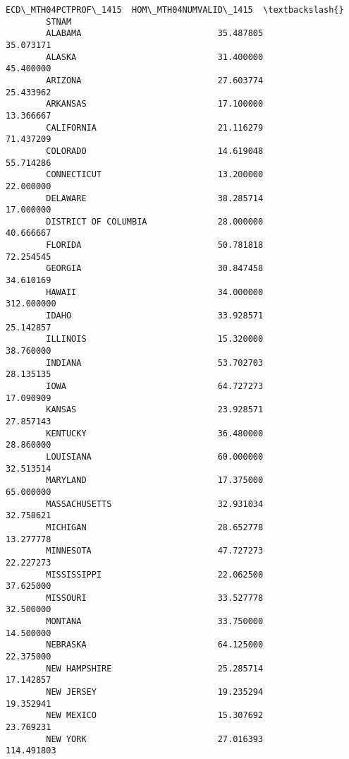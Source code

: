 \documentclass[11pt]{article}
\begin{document}
\begin{Verbatim}[commandchars=\\\{\}]
                              ECD\_MTH04PCTPROF\_1415  HOM\_MTH04NUMVALID\_1415  \textbackslash{}
        STNAM                                                                 
        ALABAMA                           35.487805               35.073171   
        ALASKA                            31.400000               45.400000   
        ARIZONA                           27.603774               25.433962   
        ARKANSAS                          17.100000               13.366667   
        CALIFORNIA                        21.116279               71.437209   
        COLORADO                          14.619048               55.714286   
        CONNECTICUT                       13.200000               22.000000   
        DELAWARE                          38.285714               17.000000   
        DISTRICT OF COLUMBIA              28.000000               40.666667   
        FLORIDA                           50.781818               72.254545   
        GEORGIA                           30.847458               34.610169   
        HAWAII                            34.000000              312.000000   
        IDAHO                             33.928571               25.142857   
        ILLINOIS                          15.320000               38.760000   
        INDIANA                           53.702703               28.135135   
        IOWA                              64.727273               17.090909   
        KANSAS                            23.928571               27.857143   
        KENTUCKY                          36.480000               28.860000   
        LOUISIANA                         60.000000               32.513514   
        MARYLAND                          17.375000               65.000000   
        MASSACHUSETTS                     32.931034               32.758621   
        MICHIGAN                          28.652778               13.277778   
        MINNESOTA                         47.727273               22.227273   
        MISSISSIPPI                       22.062500               37.625000   
        MISSOURI                          33.527778               32.500000   
        MONTANA                           33.750000               14.500000   
        NEBRASKA                          64.125000               22.375000   
        NEW HAMPSHIRE                     25.285714               17.142857   
        NEW JERSEY                        19.235294               19.352941   
        NEW MEXICO                        15.307692               23.769231   
        NEW YORK                          27.016393              114.491803   

\end{Verbatim}
\end{document}
